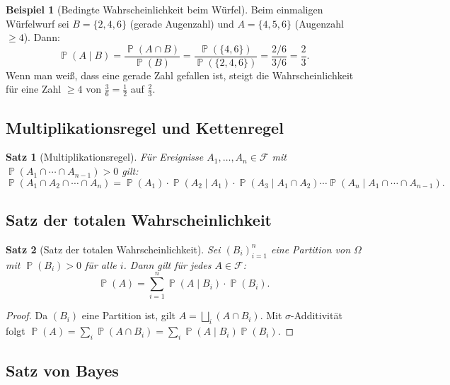 ﻿\documentclass[12pt,a4paper]{article}
\theoremstyle{definition}
\newtheorem{beispiel}{Beispiel}[section]
\theoremstyle{plain}
\newtheorem{satz}{Satz}[section]
\theoremstyle{remark}
\DeclareMathOperator{\Prob}{\mathbb{P}}
\begin{document}
\begin{beispiel}[Bedingte Wahrscheinlichkeit beim Würfel]\label{bsp:bedWuerfel}
  Beim einmaligen Würfelwurf sei $B = \{2, 4, 6\}$ (gerade Augenzahl) und
  $A = \{4, 5, 6\}$ (Augenzahl $\geq 4$). Dann:
  \[
    \Prob(A \mid B) = \frac{\Prob(A \cap B)}{\Prob(B)}
    = \frac{\Prob(\{4,6\})}{\Prob(\{2,4,6\})}
    = \frac{2/6}{3/6} = \frac{2}{3}.
  \]
  Wenn man weiß, dass eine gerade Zahl gefallen ist, steigt die Wahrscheinlichkeit
  für eine Zahl $\geq 4$ von $\frac{3}{6} = \frac{1}{2}$ auf $\frac{2}{3}$.
\end{beispiel}

\subsection{Multiplikationsregel und Kettenregel}

\begin{satz}[Multiplikationsregel]\label{satz:multregel}
  Für Ereignisse $A_1, \ldots, A_n \in \mathcal{F}$ mit
  $\Prob(A_1 \cap \cdots \cap A_{n-1}) > 0$ gilt:
  \[
    \Prob(A_1 \cap A_2 \cap \cdots \cap A_n)
    = \Prob(A_1) \cdot \Prob(A_2 \mid A_1)
      \cdot \Prob(A_3 \mid A_1 \cap A_2)
      \cdots \Prob(A_n \mid A_1 \cap \cdots \cap A_{n-1}).
  \]
\end{satz}

\subsection{Satz der totalen Wahrscheinlichkeit}

\begin{satz}[Satz der totalen Wahrscheinlichkeit]\label{satz:totalW}
  Sei $(B_i)_{i=1}^{n}$ eine Partition von $\Omega$ mit $\Prob(B_i) > 0$ für
  alle $i$. Dann gilt für jedes $A \in \mathcal{F}$:
  \[
    \Prob(A) = \sum_{i=1}^{n} \Prob(A \mid B_i) \cdot \Prob(B_i).
  \]
\end{satz}

\begin{proof}
  Da $(B_i)$ eine Partition ist, gilt $A = \bigsqcup_{i} (A \cap B_i)$.
  Mit $\sigma$-Additivität folgt
  $\Prob(A) = \sum_i \Prob(A \cap B_i) = \sum_i \Prob(A \mid B_i)\Prob(B_i)$.
\end{proof}

\subsection{Satz von Bayes}
\end{document}
